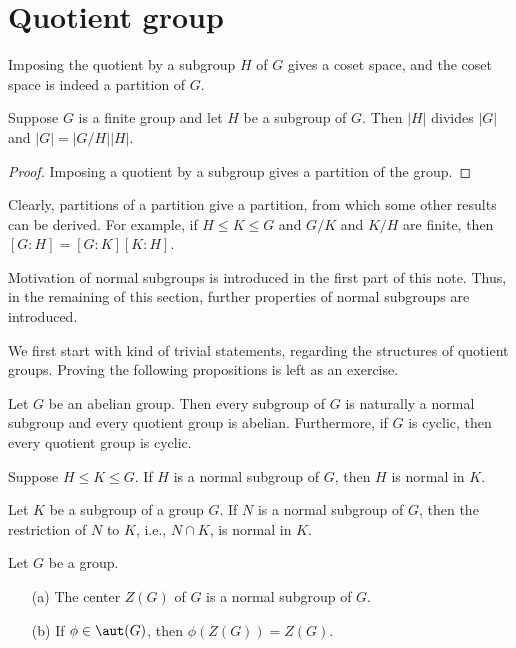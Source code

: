 \section{Quotient group}

Imposing the quotient by a subgroup $H$ of $G$ gives a coset space, and the coset space is indeed a partition of $G$.
\begin{thm}
    Suppose $G$ is a finite group and let $H$ be a subgroup of $G$.
    Then $|H|$ divides $|G|$ and $|G|=|G/H||H|$.
\end{thm}
\begin{proof}
    Imposing a quotient by a subgroup gives a partition of the group.
\end{proof}
\begin{rmk}
    Clearly, partitions of a partition give a partition, from which some other results can be derived.
    For example, if $H\leq K\leq G$ and $G/K$ and $K/H$ are finite, then $[G: H]=[G:K][K:H]$.
\end{rmk}

Motivation of normal subgroups is introduced in the first part of this note.
Thus, in the remaining of this section, further properties of normal subgroups are introduced.

We first start with kind of trivial statements, regarding the structures of quotient groups.
Proving the following propositions is left as an exercise.
\begin{prop}
    Let $G$ be an abelian group.
    Then every subgroup of $G$ is naturally a normal subgroup and every quotient group is abelian.
    Furthermore, if $G$ is cyclic, then every quotient group is cyclic.
\end{prop}
\begin{prop}
    Suppose $H\leq K\leq G$.
    If $H$ is a normal subgroup of $G$, then $H$ is normal in $K$.
\end{prop}
\begin{prop}
    Let $K$ be a subgroup of a group $G$.
    If $N$ is a normal subgroup of $G$, then the restriction of $N$ to $K$, i.e., $N\cap K$, is normal in $K$.
\end{prop}
\begin{prop}
    Let $G$ be a group.
    \begin{enumerate}
        \item[(a)]
        {
            The center $Z(G)$ of $G$ is a normal subgroup of $G$.
        }
        \item[(b)]
        {
            If $\phi\in\aut(G)$, then $\phi(Z(G))=Z(G)$.
        }
    \end{enumerate}
\end{prop}

